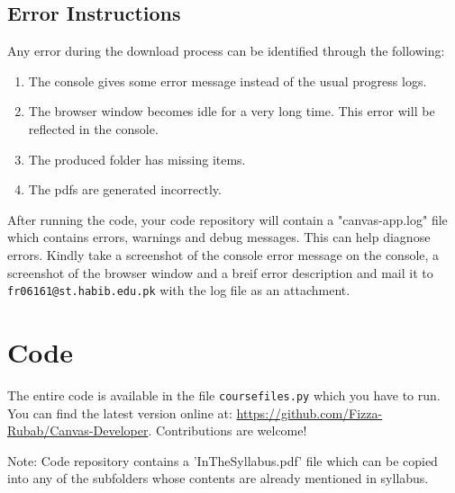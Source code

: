\documentclass{article}
\begin{document}
\subsection{Error Instructions}
Any error during the download process can be identified through the
following:

\begin{enumerate}
\def\labelenumi{\arabic{enumi}.}
\item
  The console gives some error message instead of the usual progress
  logs.
\item
  The browser window becomes idle for a very long time. This error will
  be reflected in the console.
\item
  The produced folder has missing items.
\item
  The pdfs are generated incorrectly.
\end{enumerate}

After running the code, your code repository will contain a "canvas-app.log" file which contains errors, warnings and debug messages. This can help diagnose errors. Kindly take a screenshot of the console error message on the console, a
screenshot of the browser window and a breif error description and mail
it to \texttt{fr06161@st.habib.edu.pk} with the log file as an attachment.

\section{Code}

The entire code is available in the file \texttt{coursefiles.py} which
you have to run. You can find the latest version online at:
\url{https://github.com/Fizza-Rubab/Canvas-Developer}. Contributions are
welcome!



Note: Code repository contains a 'InTheSyllabus.pdf' file which can be copied into any of the subfolders whose contents are already mentioned in syllabus.
\end{document}
